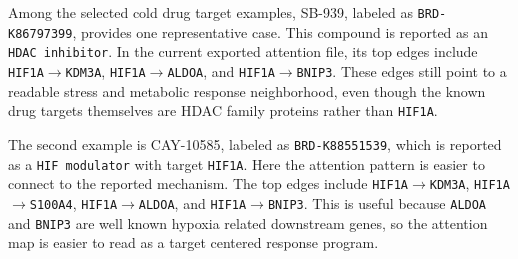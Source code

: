 \noindent Among the selected cold drug target examples, SB-939, labeled as \texttt{BRD-K86797399}, provides one representative case. This compound is reported as an \texttt{HDAC inhibitor}. In the current exported attention file, its top edges include \texttt{HIF1A}$\rightarrow$\texttt{KDM3A}, \texttt{HIF1A}$\rightarrow$\texttt{ALDOA}, and \texttt{HIF1A}$\rightarrow$\texttt{BNIP3}. These edges still point to a readable stress and metabolic response neighborhood, even though the known drug targets themselves are HDAC family proteins rather than \texttt{HIF1A}.

\noindent The second example is CAY-10585, labeled as \texttt{BRD-K88551539}, which is reported as a \texttt{HIF modulator} with target \texttt{HIF1A}. Here the attention pattern is easier to connect to the reported mechanism. The top edges include \texttt{HIF1A}$\rightarrow$\texttt{KDM3A}, \texttt{HIF1A}$\rightarrow$\texttt{S100A4}, \texttt{HIF1A}$\rightarrow$\texttt{ALDOA}, and \texttt{HIF1A}$\rightarrow$\texttt{BNIP3}. This is useful because \texttt{ALDOA} and \texttt{BNIP3} are well known hypoxia related downstream genes, so the attention map is easier to read as a target centered response program.

